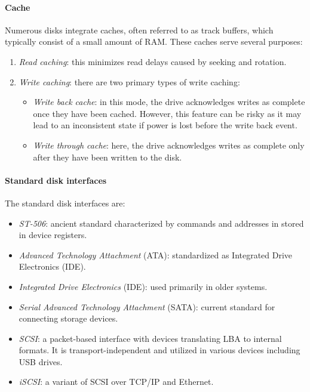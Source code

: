 \paragraph*{Cache}
Numerous disks integrate caches, often referred to as track buffers, which typically consist of a small amount of RAM.
These caches serve several purposes:
\begin{enumerate}
    \item \textit{Read caching}: this minimizes read delays caused by seeking and rotation.
    \item \textit{Write caching}: there are two primary types of write caching:
        \begin{itemize}
            \item \textit{Write back cache}: in this mode, the drive acknowledges writes as complete once they have been cached. 
                However, this feature can be risky as it may lead to an inconsistent state if power is lost before the write back event.
            \item \textit{Write through cache}: here, the drive acknowledges writes as complete only after they have been written to the disk.
        \end{itemize}
\end{enumerate}

\paragraph*{Standard disk interfaces}
The standard disk interfaces are: 
\begin{itemize}
    \item \textit{ST-506}: ancient standard characterized by commands and addresses in stored in device registers.
    \item \textit{Advanced Technology Attachment} (ATA): standardized as Integrated Drive Electronics (IDE).
    \item \textit{Integrated Drive Electronics} (IDE): used primarily in older systems.
    \item \textit{Serial Advanced Technology Attachment} (SATA): current standard for connecting storage devices.
    \item \textit{SCSI}: a packet-based interface with devices translating LBA to internal formats.
        It is transport-independent and utilized in various devices including USB drives.
    \item \textit{iSCSI}: a variant of SCSI over TCP/IP and Ethernet.
\end{itemize}

